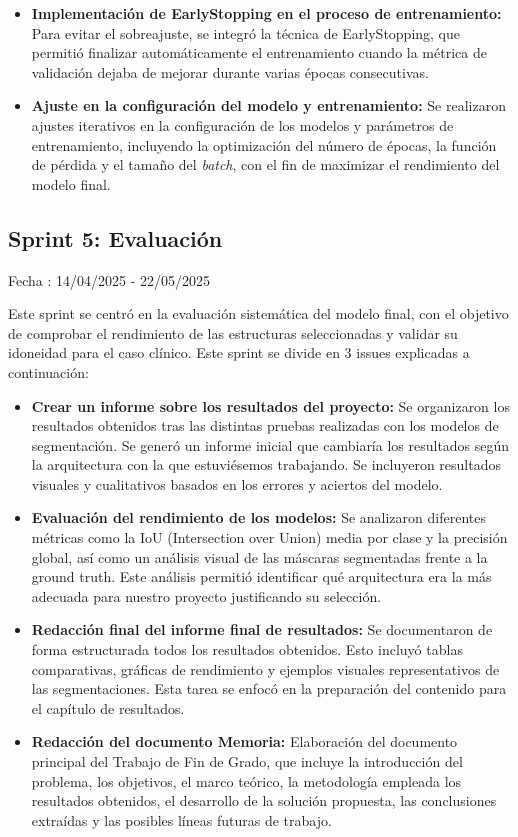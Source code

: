 \begin{itemize}
    \item \textbf{Implementación de EarlyStopping en el proceso de entrenamiento:} Para evitar el sobreajuste, se integró la técnica de EarlyStopping, que permitió finalizar automáticamente el entrenamiento cuando la métrica de validación dejaba de mejorar durante varias épocas consecutivas.
    \item \textbf{Ajuste en la configuración del modelo y entrenamiento:} Se realizaron ajustes iterativos en la configuración de los modelos y parámetros de entrenamiento, incluyendo la optimización del número de épocas, la función de pérdida y el tamaño del \textit{batch}, con el fin de maximizar el rendimiento del modelo final.
\end{itemize}
\subsection{Sprint 5: Evaluación}

Fecha : 14/04/2025 - 22/05/2025

Este sprint se centró en la evaluación sistemática del modelo final, con el objetivo de comprobar el rendimiento de las estructuras seleccionadas y validar su idoneidad para el caso clínico.
Este sprint se divide en 3 issues explicadas a continuación:
\begin{itemize}
    \item \textbf{Crear un informe sobre los resultados del proyecto:} Se organizaron los resultados obtenidos tras las distintas pruebas realizadas con los modelos de segmentación. Se generó un informe inicial que cambiaría los resultados según la arquitectura con la que estuviésemos trabajando. Se incluyeron resultados visuales y cualitativos basados en los errores y aciertos del modelo. 
    \item \textbf{Evaluación del rendimiento de los modelos:} Se analizaron diferentes métricas como la IoU (Intersection over Union) media por clase y la precisión global, así como un análisis visual de las máscaras segmentadas frente a la ground truth. Este análisis permitió identificar qué arquitectura era la más adecuada para nuestro proyecto justificando su selección.
    \item \textbf{Redacción final del informe final de resultados:} Se documentaron de forma estructurada todos los resultados obtenidos. Esto incluyó tablas comparativas, gráficas de rendimiento y ejemplos visuales representativos de las segmentaciones. Esta tarea se enfocó en la preparación del contenido para el capítulo de resultados.
    \item \textbf{Redacción del documento Memoria:} Elaboración del documento principal del Trabajo de Fin de Grado, que incluye la introducción del problema, los objetivos, el marco teórico, la metodología empleada los resultados obtenidos, el desarrollo de la solución propuesta, las conclusiones extraídas y las posibles líneas futuras de trabajo.
\end{itemize}

